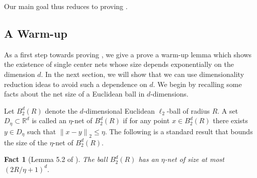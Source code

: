 \documentclass[11pt]{article}
\newtheorem{fact}[lemma]{Fact}
\theoremstyle{restate}
\theoremstyle{definition}
\newcommand{\R}{\ensuremath{\mathbb{R}}}
\newcommand{\norm}[1]{\ensuremath{\|#1\|}}
\begin{document}
Our main goal thus reduces to proving . 

\subsection{A Warm-up}
 As a first step towards proving , we give a prove a  warm-up lemma which shows the existence of single center nets whose size depends exponentially on the dimension $d$. In the next section, we will show that we can use dimensionality reduction ideas to avoid such a dependence on $d$. We begin by recalling some facts about the net size of a Euclidean ball in $d$-dimensions.


 Let $B_2^d(R)$ denote the $d$-dimensional Euclidean $\ell_2$-ball of radius $R$. A set $D_\eta \subset \R^d$ is called an $\eta$-net  of $B_2^d(R)$ if for any point $x \in B_2^d(R)$ there exists $y \in D_\eta$ such that $\norm{x - y}_2 \leq \eta$. The following is a standard result that bounds the size of the $\eta$-net of $B_2^d(R)$.

\begin{fact}[Lemma 5.2 of \cite{vershynin2010introduction}]\label{lem: eps-net}
	The ball $B_2^d(R)$ has an $\eta$-net of size at most $(2R/\eta + 1)^d.$
\end{fact}
\end{document}
